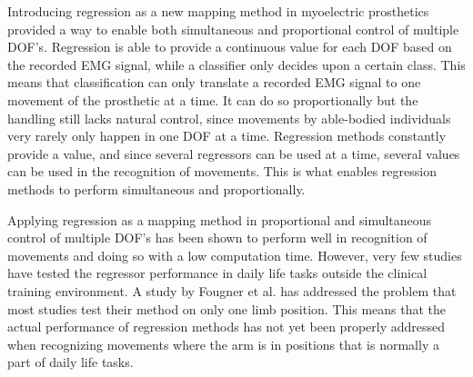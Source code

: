 Introducing regression as a new mapping method in myoelectric prosthetics provided a way to enable both simultaneous and proportional control of multiple DOF's. Regression is able to provide a continuous value for each DOF based on the recorded EMG signal, while a classifier only decides upon a certain class. \cite{hahne2014, jiang2010}%
This means that classification can only translate a recorded EMG signal to one movement of the prosthetic at a time. It can do so proportionally but the handling still lacks natural control, since movements by able-bodied individuals very rarely only happen in one DOF at a time. Regression methods constantly provide a value, and since several regressors can be used at a time, several values can be used in the recognition of movements. This is what enables regression methods to perform simultaneous and proportionally. 


Applying regression as a mapping method in proportional and simultaneous control of multiple DOF's has been shown to perform well in recognition of movements and doing so with a low computation time. \cite{hahne2014} However, very few studies have tested the regressor performance in daily life tasks outside the clinical training environment. \cite{jiang2012} A study by Fougner et al. \cite{Fougner2011} has addressed the problem that most studies test their method on only one limb position. This means that the actual performance of regression methods has not yet been properly addressed when recognizing movements where the arm is in positions that is normally a part of daily life tasks. 

